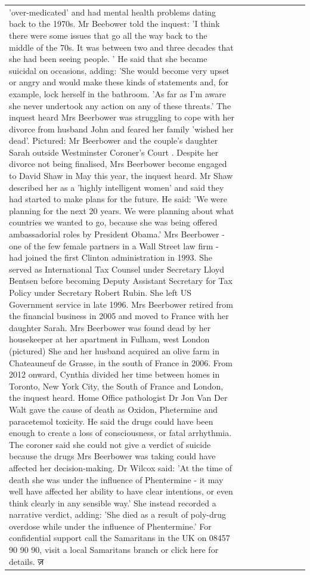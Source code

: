 \begin{table}[H]
\begin{tabular}{lllrlllll}
'over-medicated' and had mental health problems dating back to the 1970s. Mr Beebower told the inquest: 'I think there were some issues that go all the way back to the middle of the 70s. It was between two and three decades that she had been seeing people. ' He said that she became suicidal on occasions, adding: 'She would become very upset or angry and would make these kinds of statements and, for example, lock herself in the bathroom. 'As far as I'm aware she never undertook any action on any of these threats.' The inquest heard Mrs Beerbower was struggling to cope with her divorce from husband John and feared her family 'wished her dead'. Pictured: Mr Beerbower and the couple's daughter Sarah outside Westminster Coroner's Court . Despite her divorce not being finalised, Mrs Beerbower become engaged to David Shaw in May this year, the inquest heard. Mr Shaw described her as a 'highly intelligent women' and said they had started to make plans for the future. He said: 'We were planning for the next 20 years. We were planning about what countries we wanted to go, because she was being offered ambassadorial roles by President Obama.' Mrs Beerbower - one of the few female partners in a Wall Street law firm - had joined the first Clinton administration in 1993. She served as International Tax Counsel under Secretary Lloyd Bentsen before becoming Deputy Assistant Secretary for Tax Policy under Secretary Robert Rubin. She left US Government service in late 1996. Mrs Beerbower retired from the financial business in 2005 and moved to France with her daughter Sarah. Mrs Beerbower was found dead by her housekeeper at her apartment in Fulham, west London (pictured) She and her husband acquired an olive farm in Chateauneuf de Grasse, in the south of France in 2006. From 2012 onward, Cynthia divided her time between homes in Toronto, New York City, the South of France and London, the inquest heard. Home Office pathologist Dr Jon Van Der Walt gave the cause of death as Oxidon, Phetermine and paracetemol toxicity. He said the drugs could have been enough to create a loss of consciousness, or fatal arrhythmia. The coroner said she could not give a verdict of suicide because the drugs Mrs Beerbower was taking could have affected her decision-making. Dr Wilcox said: 'At the time of death she was under the influence of Phentermine - it may well have affected her ability to have clear intentions, or even think clearly in any sensible way.' She instead recorded a narrative verdict, adding: 'She died as a result of poly-drug overdose while under the influence of Phentermine.' For confidential support call the Samaritans in the UK on 08457 90 90 90, visit a local Samaritans branch or click here for details. ज़ \\

\end{tabular}
\end{table}
